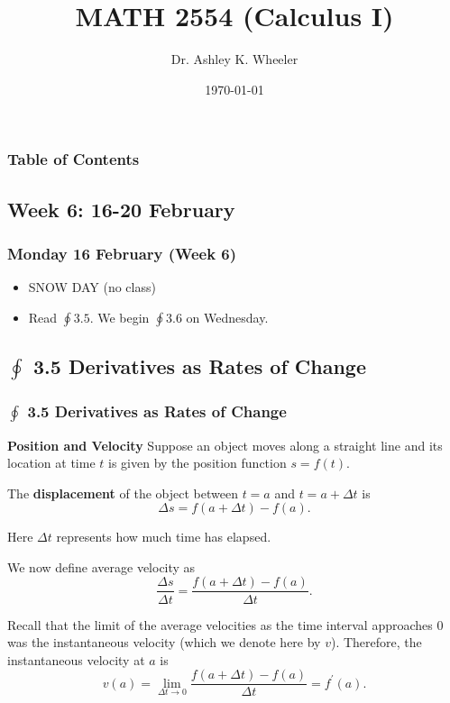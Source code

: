 \documentclass[14pt]{beamer}
\title[Cal I S2015]{MATH 2554 (Calculus I)}
\subtitle{}
\author[Wheeler]{Dr. Ashley K. Wheeler}
\institute{University of Arkansas}
\date{\today}
\begin{document}
\maketitle

\begin{frame}
\frametitle{Table of Contents}
\tableofcontents
\end{frame}


\begin{frame}
\section[Week 6]{Week 6: 16-20 February}
\frametitle{Monday 16 February (Week 6)}
\begin{itemize}
\item SNOW DAY (no class)
\item Read $\oint 3.5$.  We begin $\oint 3.6$ on Wednesday.
\end{itemize}
\end{frame}

\begin{frame}
\subsection[3.5 Derivatives as Rates of Change]{$\oint$ 3.5 Derivatives as Rates of Change}
\frametitle{$\oint$ 3.5 Derivatives as Rates of Change}
\small
{\bf Position and Velocity}
Suppose an object moves along a straight line and its location at time $t$ is given by the position function $s=f(t).$  

\bigskip 

The {\bf displacement} of the object between $t=a$ and $t=a+\Delta t$ is 
$$\Delta s = f(a+\Delta t)-f(a).$$

\bigskip

Here $\Delta t$ represents how much time has elapsed.
\end{frame}

\begin{frame}

We now define average velocity as 
$$\frac{\Delta s}{\Delta t}=\frac{f(a+\Delta t)-f(a)}{\Delta t}.$$

\bigskip

Recall that the limit of the average velocities as the time interval approaches 0 was the instantaneous velocity (which we denote here by $v$).  Therefore, the instantaneous velocity at $a$ is 
$$v(a)=\lim_{\Delta t \to 0} \frac{f(a+\Delta t)-f(a)}{\Delta t} = f^{\prime}(a).$$
\end{frame}
\end{document}
